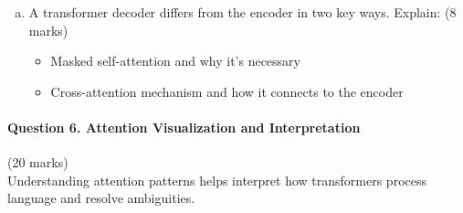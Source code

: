 \documentclass[12pt]{article}
\newcommand{\mediumanswer}{\vspace{3cm}}         %
\newcommand{\longanswer}{\vspace{4cm}}           %
\begin{document}
\begin{enumerate}[(a)]
    \longanswer
    
    \item A transformer decoder differs from the encoder in two key ways. Explain: \hfill (8 marks)
    \begin{itemize}
        \item Masked self-attention and why it's necessary
        \item Cross-attention mechanism and how it connects to the encoder
    \end{itemize}
    
    \mediumanswer
\end{enumerate}

\newpage
\paragraph{Question 6. Attention Visualization and Interpretation}\hfill (20 marks)\\
Understanding attention patterns helps interpret how transformers process language and resolve ambiguities.
\end{document}
